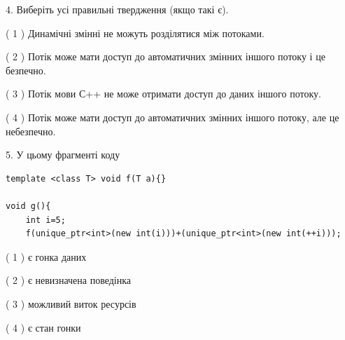 \documentclass[12pt, ukrainian]{article}
\begin{document}
\begin {large}
{%
4. Виберіть усі правильні твердження (якщо такі є).\par
\vspace{2mm}

( 1 ) Динамічні змінні не можуть розділятися між потоками.%

( 2 ) Потік може мати доступ до автоматичних змінних іншого потоку і це безпечно.%

( 3 ) Потік мови С++ не може отримати доступ до даних іншого потоку.%

( 4 ) Потік може мати доступ до автоматичних змінних іншого потоку, але це небезпечно.%


5. У цьому фрагменті коду
\begin{verbatim}
template <class T> void f(T a){}

void g(){
    int i=5;
    f(unique_ptr<int>(new int(i)))+(unique_ptr<int>(new int(++i)));
\end{verbatim}
( 1 ) є гонка даних%

( 2 ) є невизначена поведінка%

( 3 ) можливий виток ресурсів%

( 4 ) є стан гонки%
}
\end {large}
\end{document}
